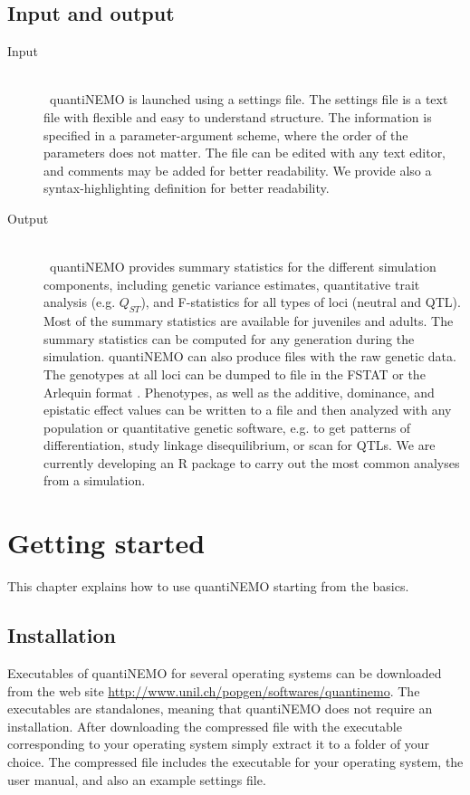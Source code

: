 \documentclass[letterpaper,12pt,oneside]{book}
\begin{document}
\section{Input and output}
\begin{description}
\item[Input]\hspace*{\fill}\\\
quantiNEMO is launched using a settings file. The settings file is a text file with flexible and easy to understand structure. The information is specified in a parameter-argument scheme, where the order of the parameters does not matter. The file can be edited with any text editor, and comments may be added for better readability. We provide also a syntax-highlighting definition for better readability.  

\item[Output]\hspace*{\fill}\\\
quantiNEMO provides summary statistics for the different simulation components, including genetic variance estimates, quantitative trait analysis (e.g. $Q_{ST}$), and F-statistics for all types of loci (neutral and QTL). Most of the summary statistics are available for juveniles and adults. The summary statistics can be computed for any generation during the simulation. quantiNEMO can also produce files with the raw genetic data. The genotypes at all loci can be dumped to file in the FSTAT \citep{Goudet_1995} or the Arlequin format \citep{Excoffier_2010}. Phenotypes, as well as the additive, dominance, and epistatic effect values can be written to a file and then analyzed with any population or quantitative genetic software, e.g.  to get patterns of differentiation, study linkage disequilibrium, or scan for QTLs. We are currently developing an R package to carry out the most common analyses from a simulation.
\end{description}



\newpage
\chapter{Getting started}
This chapter explains how to use quantiNEMO starting from the basics. 


\section{Installation}
Executables of quantiNEMO for several operating systems can be downloaded from the web site \url{http://www.unil.ch/popgen/softwares/quantinemo}. The executables are standalones, meaning that quantiNEMO does not require an installation. After downloading the compressed file with the executable corresponding to your operating system simply extract it to a folder of your choice. The compressed file includes the executable for your operating system, the user manual, and also an example settings file.
\end{document}
